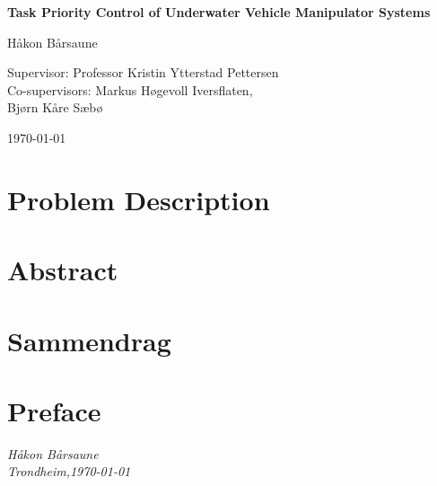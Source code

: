 \documentclass[10pt,b5paper,openright]{book}
\begin{document}
\begin{titlepage}
    \begin{center}
        \vspace*{1cm}
        \huge{\textbf{Task Priority Control of Underwater Vehicle Manipulator Systems}}
        \vspace{2cm}

        \Large{Håkon Bårsaune}
        \vspace{2cm}

        \large{
            Supervisor: Professor Kristin Ytterstad Pettersen \\
            Co-supervisors: Markus Høgevoll Iversflaten, \\
            Bjørn Kåre Sæbø %
        }

        \vspace{2cm}
        \today
        \vfill
        \begin{figure}[htbp]
            \centering
            
        \end{figure}
    \end{center}
\end{titlepage}

\clearpage
\restoregeometry 


\section*{\Huge{Problem Description}}

\newpage

\section*{\Huge{Abstract}}

\newpage

\section*{\Huge{Sammendrag}}

\newpage

\section*{\Huge{Preface}}

\begin{flushright}
    \textit{Håkon Bårsaune} \\
    \textit{Trondheim,\today}
\end{flushright}
\newpage
\end{document}
